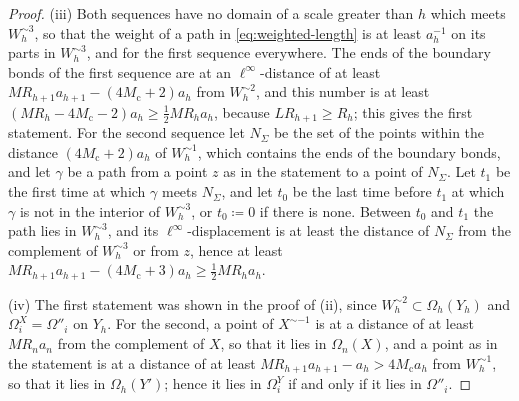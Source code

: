 \documentclass[11pt]{preprint}
\numberwithin{equation}{section}
\begin{document}
\begin{proof}
(iii) Both sequences have no domain of a scale greater than $h$ which meets $W_h^{\sim3}$, so that the weight of a path in \eqref{eq:weighted-length} is at least $a_h^{-1}$ on its parts in $W_h^{\sim3}$, and for the first sequence everywhere. The ends of the boundary bonds of the first sequence are at an $\ell^\infty$-distance of at least $MR_{h+1}a_{h+1} - (4M_{\mathrm c} + 2)a_h$ from $W_h^{\sim2}$, and this number is at least $(MR_h - 4M_{\mathrm c} - 2)a_h \geqslant \frac{1}{2}MR_ha_h$, because $LR_{h+1} \geqslant R_h$; this gives the first statement. For the second sequence let $N_\Sigma$ be the set of the points within the distance $(4M_{\mathrm c} + 2)a_h$ of $W_h^{\sim1}$, which contains the ends of the boundary bonds, and let $\gamma$ be a path from a point $z$ as in the statement to a point of $N_\Sigma$. Let $t_1$ be the first time at which $\gamma$ meets $N_\Sigma$, and let $t_0$ be the last time before $t_1$ at which $\gamma$ is not in the interior of $W_h^{\sim3}$, or $t_0 \coloneqq 0$ if there is none. Between $t_0$ and $t_1$ the path lies in $W_h^{\sim3}$, and its $\ell^\infty$-displacement is at least the distance of $N_\Sigma$ from the complement of $W_h^{\sim3}$ or from $z$, hence at least $MR_{h+1}a_{h+1} - (4M_{\mathrm c} + 3)a_h \geqslant \frac{1}{2}MR_ha_h$.

(iv) The first statement was shown in the proof of (ii), since $W_h^{\sim2} \subset \Omega_h(Y_h)$ and $\Omega^X_i = \Omega''_i$ on $Y_h$. For the second, a point of $X^{\sim-1}$ is at a distance of at least $MR_na_n$ from the complement of $X$, so that it lies in $\Omega_n(X)$, and a point as in the statement is at a distance of at least $MR_{h+1}a_{h+1} - a_h > 4M_{\mathrm c}a_h$ from $W_h^{\sim1}$, so that it lies in $\Omega_h(Y')$; hence it lies in $\Omega^Y_i$ if and only if it lies in $\Omega''_i$.
\end{proof}
\end{document}
